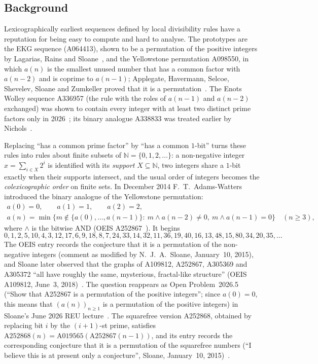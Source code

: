 \documentclass[11pt]{amsart}
\theoremstyle{definition}
\theoremstyle{remark}
\newcommand{\N}{\mathbb{N}}
\begin{document}
\subsection{Background}
Lexicographically earliest sequences defined by local divisibility rules have a reputation for
being easy to compute and hard to analyse. The prototypes are the EKG sequence (A064413),
shown to be a permutation of the positive integers by Lagarias, Rains and
Sloane~\cite{LRS}, and the Yellowstone permutation A098550, in which $a(n)$ is the smallest
unused number that has a common factor with $a(n-2)$ and is coprime to $a(n-1)$; Applegate,
Havermann, Selcoe, Shevelev, Sloane and Zumkeller proved that it is a permutation~\cite{Yell}.
The Enots Wolley sequence A336957 (the rule with the roles of $a(n-1)$ and $a(n-2)$ exchanged)
was shown to contain every integer with at least two distinct prime factors only in
2026~\cite{Nichols26}; its binary analogue A338833 was treated earlier by Nichols~\cite{Nichols22}.

Replacing ``has a common prime factor'' by ``has a common $1$-bit'' turns these rules into rules
about finite subsets of $\N=\{0,1,2,\dots\}$: a non-negative integer $x=\sum_{i\in X}2^i$ is
identified with its \emph{support} $X\subseteq\N$, two integers share a $1$-bit exactly when
their supports intersect, and the usual order of integers becomes the \emph{colexicographic
order} on finite sets. In December 2014 F.~T.~Adams-Watters introduced the binary analogue of the
Yellowstone permutation:
\begin{equation}\label{eq:def}
\begin{gathered}
a(0)=0,\qquad a(1)=1,\qquad a(2)=2,\\
a(n)=\min\bigl\{m\notin\{a(0),\dots,a(n-1)\}:\ m\wedge a(n-2)\neq0,\ m\wedge a(n-1)=0\bigr\}
\quad(n\ge3),
\end{gathered}
\end{equation}
where $\wedge$ is the bitwise AND (OEIS A252867~\cite{A252867}). It begins
\[
0, 1, 2, 5, 10, 4, 3, 12, 17, 6, 9, 18, 8, 7, 24, 33, 14, 32, 11, 36, 19, 40, 16, 13,
48, 15, 80, 34, 20, 35,\dots
\]
The OEIS entry records the conjecture that it is a permutation of the non-negative integers
(comment as modified by N.~J.~A.~Sloane, January~10, 2015), and Sloane later observed that
the graphs of A109812, A252867, A305369 and A305372 ``all have roughly the same, mysterious,
fractal-like structure'' (OEIS A109812, June~3, 2018)~\cite{A252868}.
The question reappears as Open Problem~2026.5 (``Show that A252867 is a permutation of the
positive integers''; since $a(0)=0$, this means that $(a(n))_{n\ge1}$ is a permutation of the
positive integers) in Sloane's June 2026 REU lecture~\cite{REU26}. The
squarefree version A252868, obtained by replacing bit $i$ by the $(i+1)$-st prime, satisfies
$\mathrm{A252868}(n)=\mathrm{A019565}(\mathrm{A252867}(n-1))$, and its entry records the
corresponding conjecture that it is a permutation of the squarefree numbers (``I believe this
is at present only a conjecture'', Sloane, January~10, 2015)~\cite{A252868}.
\end{document}
